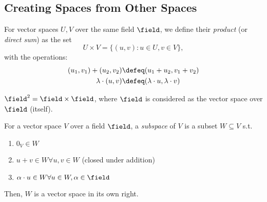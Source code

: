 
\subsection{Creating Spaces from Other Spaces}
\begin{definition}
For vector spaces $U, V$ over the same field $\field$, we define their \emph{product} (or \emph{direct sum}) as the set $$U \times V = \{(u,v):u \in U, v \in V\},$$ with the operations:
\begin{align*}
    (u_1, v_1) + (u_2, v_2) &\defeq (u_1 + u_2, v_1 + v_2)\\
    \lambda \cdot (u, v)&\defeq (\lambda \cdot u, \lambda \cdot v)
\end{align*}
\end{definition}

\begin{example}[$\field$]
    $\field^2 = \field \times \field$, where $\field$ is considered as the vector space over $\field$ (itself).
\end{example}

\begin{definition}[Subspace]
    For a vector space $V$ over a field $\field$, a \emph{subspace} of $V$ is a subset $W \subseteq V$ s.t.\begin{enumerate}
        \item $0_V \in W$\footnotemark
        \item $u + v \in W \forall u, v \in W$ (closed under addition)
        \item $\alpha \cdot u \in W \forall u \in W, \alpha \in \field$\footnotemark
    \end{enumerate}    
    Then, $W$ is a vector space in its own right.
\end{definition}



